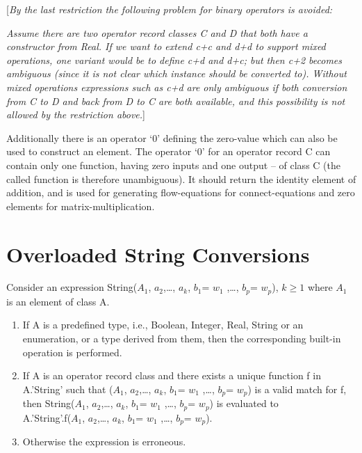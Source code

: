 \documentclass[10pt,a4paper]{report}
\def\doublelabel#1{\label{#1}\hypertarget{#1}{}}
\renewcommand{\labelenumi}{\arabic{enumi}.}
\begin{document}
{[}\emph{By the last restriction the following problem for binary
operators is avoided: }

\emph{Assume there are two operator record classes C and D that both
have a constructor from Real. If we want to extend c+c and d+d to
support mixed operations, one variant would be to define c+d and d+c;
but then c+2 becomes ambiguous (since it is not clear which instance
should be converted to). Without mixed operations expressions such as
c+d are only ambiguous if both conversion from C to D and back from D to
C are both available, and this possibility is not allowed by the
restriction above.}{]}

Additionally there is an operator `0' defining the zero-value which can
also be used to construct an element. The operator `0' for an operator
record C can contain only one function, having zero inputs and one
output -- of class C (the called function is therefore unambiguous). It
should return the identity element of addition, and is used for
generating flow-equations for connect-equations and zero elements for
matrix-multiplication.

\section{Overloaded String Conversions}\doublelabel{overloaded-string-conversions}

Consider an expression String($A_1$,
$a_{2}$,\ldots{}, $a_{k}$, $b_{1}$=
$w_{1}$ ,\ldots{}, $b_{p}$= $w_{p}$), $k\ge 1$ where $A_1$ is an element of class A.

\begin{enumerate}
\def\labelenumi{\arabic{enumi}.}
\item
  If A is a predefined {type}, i.e., Boolean, Integer, Real, String or
  an enumeration, or a type derived from them, then the corresponding
  built-in operation is performed.
\item
  If A is an operator {record class} and there exists a unique function
  f in A.'String' such that ($A_1$,
  $a_{2}$,\ldots{}, $a_{k}$, $b_{1}$=
  $w_{1}$ ,\ldots{}, $b_{p}$= $w_{p}$)
  is a valid match for f, then String($A_1$,
  $a_{2}$,\ldots{}, $a_{k}$, $b_{1}$=
  $w_{1}$ ,\ldots{}, $b_{p}$= $w_{p}$)
  is evaluated to\\
  A.'String'.f($A_1$, $a_{2}$,\ldots{},
  $a_{k}$, $b_{1}$= $w_{1}$ ,\ldots{},
  $b_{p}$= $w_{p}$).
\item
  Otherwise the expression is erroneous.
\end{enumerate}
\end{document}
